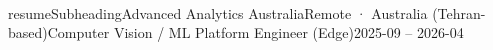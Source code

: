 \\resumeSubheading{Advanced Analytics Australia}{Remote · Australia (Tehran-based)}{Computer Vision / ML Platform Engineer (Edge)}{2025-09 -- 2026-04}
